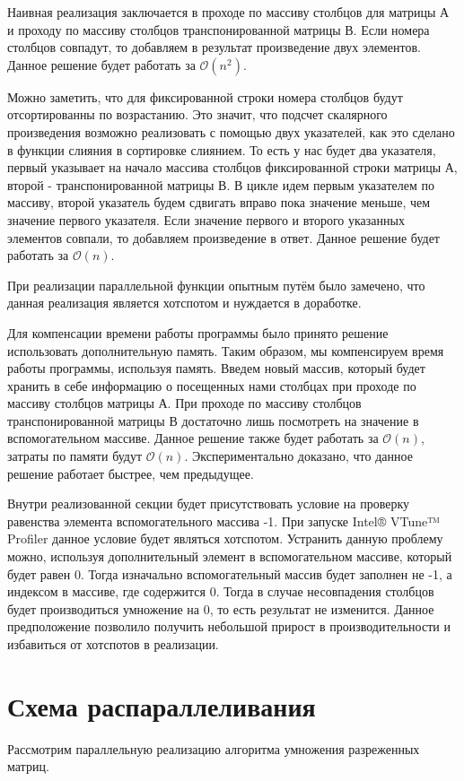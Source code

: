 \documentclass{report}
\begin{document}
Наивная реализация заключается в проходе по массиву столбцов для матрицы А и проходу по массиву столбцов транспонированной матрицы В. Если номера столбцов совпадут, то добавляем в результат произведение двух элементов. Данное решение будет работать за $\mathcal{O}(n^2)$.

\par Можно заметить, что для фиксированной строки номера столбцов будут отсортированны по возрастанию. Это значит, что подсчет скалярного произведения возможно реализовать с помощью двух указателей, как это сделано в функции слияния в сортировке слиянием.
То есть у нас будет два указателя, первый указывает на начало массива столбцов фиксированной строки матрицы А, второй - транспонированной матрицы В. В цикле идем первым указателем по массиву, второй указатель будем сдвигать вправо пока значение меньше, чем значение первого указателя. Если значение первого и второго указанных элементов совпали, то добавляем произведение в ответ. Данное решение будет работать за $\mathcal{O}(n)$.
\par При реализации параллельной функции опытным путём было замечено, что данная реализация является хотспотом и нуждается в доработке.
\par Для компенсации времени работы программы было принято решение использовать дополнительную память. Таким образом, мы компенсируем время работы программы, используя память. Введем новый массив, который будет хранить в себе информацию о посещенных нами столбцах при проходе по массиву столбцов матрицы А. При проходе по массиву столбцов транспонированной матрицы В достаточно лишь посмотреть на значение в вспомогательном массиве. Данное решение также будет работать за $\mathcal{O}(n)$, затраты по памяти будут $\mathcal{O}(n)$. Экспериментально доказано, что данное решение работает быстрее, чем предыдущее.
\par Внутри реализованной секции будет присутствовать условие на проверку равенства элемента вспомогательного массива -1. При запуске Intel® VTune™ Profiler данное условие будет являться хотспотом. Устранить данную проблему можно, используя дополнительный элемент в вспомогательном массиве, который будет равен 0. Тогда изначально вспомогательный массив будет заполнен не -1, а индексом в массиве, где содержится 0. Тогда в случае несовпадения столбцов будет производиться умножение на 0, то есть результат не изменится. Данное предположение позволило получить небольшой прирост в производительности и избавиться от хотспотов в реализации.
\newpage
\section*{Схема распараллеливания}
Рассмотрим параллельную реализацию алгоритма умножения разреженных матриц.
\end{document}
